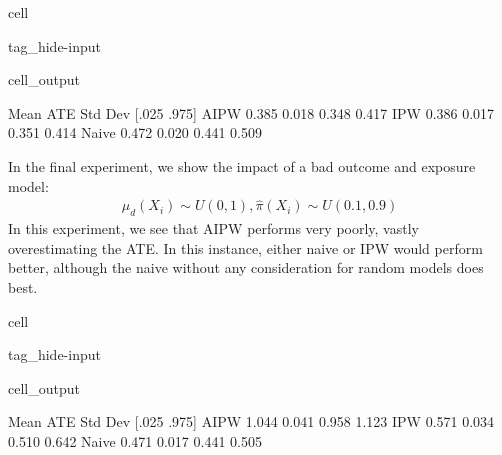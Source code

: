\documentclass[letterpaper,10pt,english]{jupyterBook}
\begin{document}
\begin{sphinxuseclass}{cell}
\begin{sphinxuseclass}{tag_hide-input}\begin{sphinxVerbatimOutput}

\begin{sphinxuseclass}{cell_output}
\begin{sphinxVerbatim}[commandchars=\\\{\}]
       Mean ATE  Std Dev  [.025  .975]
AIPW      0.385    0.018  0.348  0.417
IPW       0.386    0.017  0.351  0.414
Naive     0.472    0.020  0.441  0.509
\end{sphinxVerbatim}

\noindent{}

\end{sphinxuseclass}\end{sphinxVerbatimOutput}

\end{sphinxuseclass}
\end{sphinxuseclass}
\sphinxAtStartPar
In the final experiment, we show the impact of a bad outcome and exposure model:
\begin{equation*}
\begin{split}\mu_d(X_i) \sim U(0,1),  \hat \pi (X_i) \sim U(0.1,0.9) \end{split}
\end{equation*}
\sphinxAtStartPar
In this experiment, we see that AIPW performs very poorly, vastly over\sphinxhyphen{}estimating the ATE. In this instance, either naive or IPW would perform better, although the naive without any consideration for random models does best.

\begin{sphinxuseclass}{cell}
\begin{sphinxuseclass}{tag_hide-input}\begin{sphinxVerbatimOutput}

\begin{sphinxuseclass}{cell_output}
\begin{sphinxVerbatim}[commandchars=\\\{\}]
       Mean ATE  Std Dev  [.025  .975]
AIPW      1.044    0.041  0.958  1.123
IPW       0.571    0.034  0.510  0.642
Naive     0.471    0.017  0.441  0.505
\end{sphinxVerbatim}

\noindent{}

\end{sphinxuseclass}\end{sphinxVerbatimOutput}

\end{sphinxuseclass}
\end{sphinxuseclass}
\end{document}
